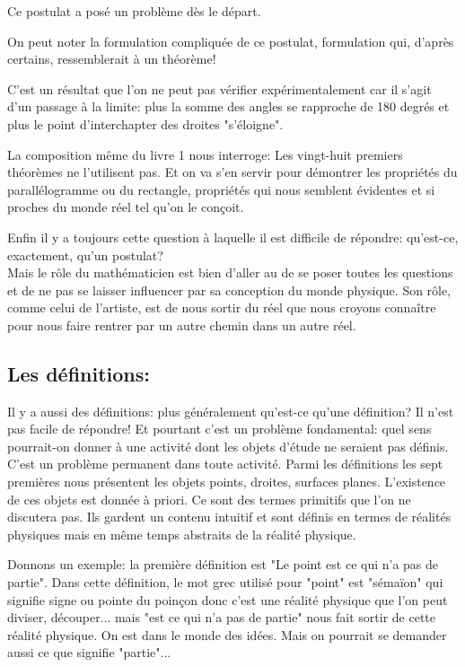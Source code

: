 \documentclass[a4paper, 12pt, twoside]{book}
\begin{document}
 Ce postulat a posé un problème dès le départ.\
 
   
  On peut noter la formulation compliquée de ce postulat, formulation qui, d'après certains, ressemblerait à un théorème!\
  
   C'est un résultat que l'on ne peut pas vérifier expérimentalement car il s'agit d'un passage à la limite: plus la somme des angles se rapproche de 180 degrés et plus le point d'interchapter des droites "s'éloigne".\bigskip 
  
   La composition même du livre 1 nous interroge: Les vingt-huit premiers théorèmes ne l'utilisent pas. Et on va s'en servir pour démontrer les propriétés du parallélogramme ou du rectangle, propriétés qui nous semblent évidentes et si proches du monde réel tel qu'on le conçoit.\
   
   Enfin il y a toujours cette question à laquelle il est difficile de répondre: qu'est-ce, exactement, qu'un postulat? \\
   
   Mais le rôle du mathématicien est bien d'aller au de se poser toutes les questions et de ne pas se laisser influencer par sa conception du monde physique. Son rôle, comme celui de l'artiste, est de nous sortir du réel que nous croyons connaître pour nous faire rentrer par un autre chemin dans un autre réel.\\
   
   
   
 \subsection{Les définitions:}
         

   Il y a  aussi des  définitions: plus généralement qu'est-ce qu'une définition? Il n'est pas facile de répondre!  Et pourtant c'est un problème fondamental: quel sens pourrait-on donner à une activité dont les objets d'étude ne seraient pas définis. C'est un problème permanent dans toute activité. Parmi les définitions les sept premières nous présentent les objets points, droites, surfaces planes. L'existence de ces objets est donnée à priori. Ce sont des termes primitifs que l'on ne discutera pas. Ils gardent un contenu intuitif et sont définis en termes de réalités physiques mais en même temps abstraits de la réalité physique.  \bigskip 
   
   
    Donnons un exemple: la première définition est "Le point est ce qui n'a pas de partie". Dans cette définition, le mot grec utilisé pour "point" est "sémaïon" qui signifie signe ou pointe du poinçon donc c'est une réalité physique que l'on peut diviser, découper... mais "est ce qui n'a pas de partie" nous fait sortir de cette réalité physique.  On est dans le monde des idées.  Mais on pourrait se demander aussi ce que signifie "partie"...
\end{document}
